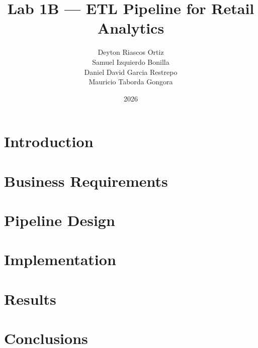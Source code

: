 \documentclass[12pt,a4paper]{article}
\title{Lab 1B --- ETL Pipeline for Retail Analytics}
\author{Deyton Riascos Ortiz\\Samuel Izquierdo Bonilla\\Daniel David Garcia Restrepo\\Mauricio Taborda Gongora}
\date{2026}
\begin{document}
\maketitle

\section{Introduction}

\section{Business Requirements}

\section{Pipeline Design}

\section{Implementation}

\section{Results}

\section{Conclusions}
\end{document}
